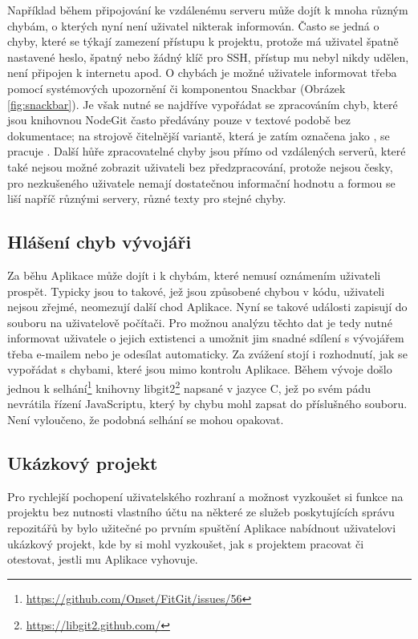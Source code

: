 Například během připojování ke vzdálenému serveru může dojít k mnoha různým chybám, o kterých nyní není uživatel nikterak informován. Často se jedná o chyby, které se týkají zamezení přístupu k projektu, protože má uživatel špatně nastavené heslo, špatný nebo žádný klíč pro SSH, přístup mu nebyl nikdy udělen, není připojen k internetu apod. O chybách je možné uživatele informovat třeba pomocí systémových upozornění či komponentou Snackbar (Obrázek \ref{fig:snackbar}). Je však nutné se najdříve vypořádat se zpracováním chyb, které jsou knihovnou NodeGit často předávány pouze v textové podobě bez dokumentace; na strojově čitelnější variantě, která je zatím označena jako , se pracuje \cite{nodegit-error-codes}. Další hůře zpracovatelné chyby jsou přímo od vzdálených serverů, které také nejsou možné zobrazit uživateli bez předzpracování, protože nejsou česky, pro nezkušeného uživatele nemají dostatečnou informační hodnotu a formou se liší napříč různými servery, různé texty pro stejné chyby.

\subsection{Hlášení chyb vývojáři}

Za běhu Aplikace může dojít i k chybám, které nemusí oznámením uživateli prospět. Typicky jsou to takové, jež jsou způsobené chybou v kódu, uživateli nejsou zřejmé, neomezují další chod Aplikace. Nyní se takové události zapisují do souboru na uživatelově počítači. Pro možnou analýzu těchto dat je tedy nutné informovat uživatele o jejich extistenci a umožnit jim snadné sdílení s vývojářem třeba e-mailem nebo je odesílat automaticky. Za zvážení stojí i rozhodnutí, jak se vypořádat s chybami, které jsou mimo kontrolu Aplikace. Během vývoje došlo jednou k selhání\footnote{\url{https://github.com/Onset/FitGit/issues/56}} knihovny libgit2\footnote{\url{https://libgit2.github.com/}} napsané v jazyce C, jež po svém pádu nevrátila řízení JavaScriptu, který by chybu mohl zapsat do příslušného souboru. Není vyloučeno, že podobná selhání se mohou opakovat.

\subsection{Ukázkový projekt}

Pro rychlejší pochopení uživatelského rozhraní a možnost vyzkoušet si funkce na projektu bez nutnosti vlastního účtu na některé ze služeb poskytujících správu repozitářů by bylo užitečné po prvním spuštění Aplikace nabídnout uživatelovi ukázkový projekt, kde by si mohl vyzkoušet, jak s projektem pracovat či otestovat, jestli mu Aplikace vyhovuje.


